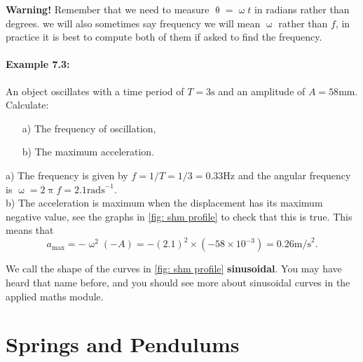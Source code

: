 \documentclass[a4paper,12pt]{book}
\begin{document}
\textbf{Warning!} Remember that we need to measure $\uptheta=\upomega t$ in radians rather than degrees. we will also sometimes say frequency we will mean $\upomega$ rather than $f$, in practice it is best to compute both of them if asked to find the frequency.\\

\paragraph{Example 7.3:} An object oscillates with a time period of $T=3\text{s}$ and an amplitude of $A=58\text{mm}$. Calculate:
\begin{itemize}
\setlength{\itemsep}{-5pt}
    \item[a)] The frequency of oscillation,
    \item[b)] The maximum acceleration.
\end{itemize}  

a) The frequency is given by $f=1/T=1/3=0.33\text{Hz}$ and the angular frequency is $\upomega=2\uppi f=2.1\text{rads}^{-1}$.\\

b) The acceleration is maximum when the displacement has its maximum negative value, see the graphs in \cref{fig: shm profile} to check that this is true. This means that
\begin{equation*}
a_{\text{max}}=-\upomega^{2}(-A)=-(2.1)^{2}\times (-58\times10^{-3})=0.26\text{m/s}^{2}.
\end{equation*}

We call the shape of the curves in \cref{fig: shm profile} \textbf{sinusoidal}. You may have heard that name before, and you should see more about sinusoidal curves in the applied maths module.


\section{Springs and Pendulums}
\end{document}
